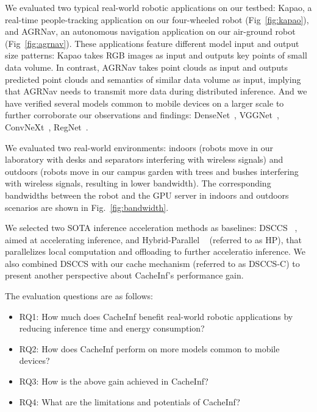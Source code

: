 We evaluated two typical real-world robotic applications on our testbed: Kapao, a real-time people-tracking application on our four-wheeled robot (Fig~\ref{fig:kapao}), and AGRNav, an autonomous navigation application on our air-ground robot (Fig~\ref{fig:agrnav}). 
These applications feature different model input and output size patterns: Kapao takes RGB images as input and outputs key points of small data volume. In contrast, AGRNav takes point clouds as input and outputs predicted point clouds and semantics of similar data volume as input, implying that AGRNav needs to transmit more data during distributed inference. 
And we have verified several models common to mobile devices on a larger scale to further corroborate our observations and findings: DenseNet~\cite{huang2018densely}, VGGNet~\cite{simonyan2015deep}, ConvNeXt~\cite{woo2023convnext}, RegNet~\cite{xu2022regnet}.

We evaluated two real-world environments: indoors (robots move in our laboratory with desks and separators interfering with wireless signals) and outdoors (robots move in our campus garden with trees and bushes interfering with wireless signals, resulting in lower bandwidth). 
The corresponding bandwidths between the robot and the GPU server in indoors and outdoors scenarios are shown in Fig.~\ref{fig:bandwidth}.

We selected two SOTA inference acceleration methods as baselines: DSCCS ~\cite{liang2023dnn}, aimed at accelerating inference, and Hybrid-Parallel ~\cite{sun2024hybridparallel} (referred to as HP), that parallelizes local computation and offloading to further acceleratio inference. 
We also combined DSCCS with our cache mechanism (referred to as DSCCS-C) to present another perspective about CacheInf's performance gain.

The evaluation questions are as follows:
\begin{itemize}
    \item RQ1: How much does CacheInf benefit real-world robotic applications by reducing inference time and energy consumption?
    \item RQ2: How does CacheInf perform on more models common to mobile devices?
    \item RQ3: How is the above gain achieved in CacheInf?
    \item RQ4: What are the limitations and potentials of CacheInf?
\end{itemize}

